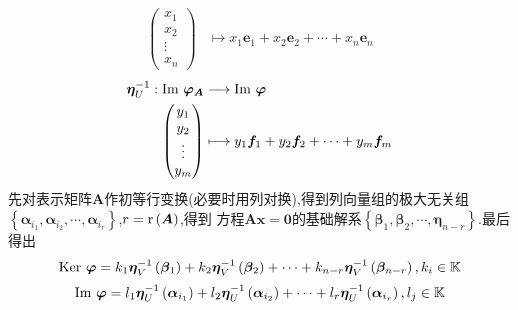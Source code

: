 {\begin{align*}
        \begin{pmatrix}
            x_1 \\x_2\\\vdots\\x_n
        \end{pmatrix}                      & \longmapsto
        x_1\bm{e}_1+x_2\bm{e}_2+\cdots+x_n\bm{e}_n
    \end{align*}
    \begin{align*}
        \bm{\eta}_U^{-1}:\operatorname{Im\,}\bm{\varphi}_{\bm{A}} & \longrightarrow \operatorname{Im\,}\bm{\varphi} \\
        \begin{pmatrix}
            y_1 \\y_2\\\vdots\\y_m
        \end{pmatrix}                       & \longmapsto
        y_1\bm{f}_1+y_2\bm{f}_2+\cdots+y_m\bm{f}_m
    \end{align*}
}
先对表示矩阵$\bm{A}$作初等行变换(必要时用列对换),得到列向量组的极大无关组$\left\{
    \bm{\alpha}_{i_1},\bm{\alpha}_{i_2},\cdots,\bm{\alpha}_{i_r}
    \right\}$,$r=\mathrm{r} \left(\bm{A}\right)$,得到
方程$\bm{Ax}=\bm{0}$的基础解系$\left\{\bm{\beta}_1,\bm{\beta}_2,\cdots,\bm{\eta}_{n-r}\right\}$.最后得出
\[
    \operatorname{Ker\,} \bm{\varphi}=k_1\bm{\eta}_V^{-1}\left(\bm{\beta}_1\right)+
    k_2\bm{\eta}_V^{-1}\left(\bm{\beta}_2\right)+\cdots+
    k_{n-r}\bm{\eta}_V^{-1}\left(\bm{\beta}_{n-r}\right),k_i \in \mathbb{K}
\]
\[
    \operatorname{Im\,}\bm{\varphi}=l_1\bm{\eta}_U^{-1}\left(\bm{\alpha}_{i_1}\right)+
    l_2\bm{\eta}_U^{-1}\left(\bm{\alpha}_{i_2}\right)
    +\cdots+
    l_r\bm{\eta}_U^{-1}\left(\bm{\alpha}_{i_r}\right),l_j \in \mathbb{K}
\]
